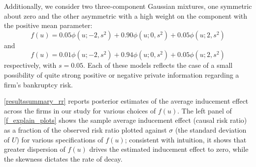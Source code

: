 \documentclass[aoas,preprint, 11pt, dvipsnames, table, x11name]{imsart}
\theoremstyle{remark}
\begin{document}
	Additionally, we consider two three-component Gaussian mixtures, one symmetric about zero and the other asymmetric with a high weight on the component with the positive mean parameter:
	$$f(u) = 0.05 \phi(u ; -2, s^2) + 0.90 \phi(u ; 0, s^2) + 0.05 \phi(u ; 2, s^2)$$
	and
	$$f(u) = 0.01 \phi(u ; -2, s^2) + 0.94 \phi(u ; 0, s^2) + 0.05 \phi(u ; 2, s^2)$$
	respectively, with $s = 0.05$. Each of these models reflects the case of a small possibility of quite strong positive or negative private information regarding a firm's bankruptcy risk.
	
	\autoref{resultssummary_rr} reports posterior estimates of the average inducement effect across the firms in our study for various choices of $f(u)$. The left panel of \autoref{f_explain_plots} shows the sample average inducement effect (causal risk ratio) as a fraction of the observed risk ratio plotted against $\sigma$ (the standard deviation of $U$) for various  specifications of $f(u)$; consistent with intuition, it shows that greater dispersion of $f(u)$ drives the estimated inducement effect to zero, while the skewness dictates the rate of decay.
\end{document}
